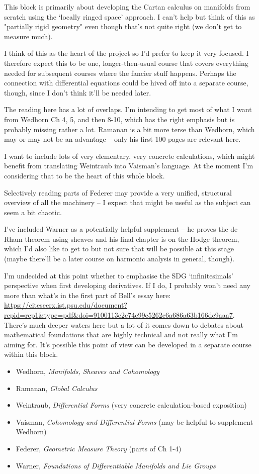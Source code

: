 \documentclass[article]{article}
\begin{document}
This block is primarily about developing the Cartan calculus on manifolds from scratch using the `locally ringed space' approach. I can't help but think of this as "partially rigid geometry" even though that's not quite right (we don't get to measure much). 

I think of this as the heart of the project so I'd prefer to keep it very focused. I therefore expect this to be one, longer-then-usual course that covers everything needed for subsequent courses where the fancier stuff happens. Perhaps the connection with differential equations could be hived off into a separate course, though, since I don't think it'll be needed later.

The reading here has a lot of overlaps. I'm intending to get most of what I want from Wedhorn Ch 4, 5, and then 8-10, which has the right emphasis but is probably missing rather a lot. Ramanan is a bit more terse than Wedhorn, which may or may not be an advantage -- only his first 100 pages are relevant here.

I want to include lots of very elementary, very concrete calculations, which might benefit from translating Weintraub into Vaisman's language. At the moment I'm considering that to be the heart of this whole block.

Selectively reading parts of Federer may provide a very unified, structural overview of all the machinery -- I expect that might be useful as the subject can seem a bit chaotic. 

I've included Warner as a potentially helpful supplement -- he proves the de Rham theorem using sheaves and his final chapter is on the Hodge theorem, which I'd also like to get to but not sure that will be possible at this stage (maybe there'll be a later course on harmonic analysis in general, though). 

I'm undecided at this point whether to emphasise the SDG `infinitesimals' perspective when first developing derivatives. If I do, I probably won't need any more than what's in the first part of Bell's essay here: \url{https://citeseerx.ist.psu.edu/document?repid=rep1&type=pdf&doi=9100113e2c74c99c5262c6a686a63b166dc9aaa7}. There's much deeper waters here but a lot of it comes down to debates about mathematical foundations that are highly technical and not really what I'm aiming for. It's possible this point of view can be developed in a separate course within this block.

\begin{itemize}
	\item[]{Wedhorn, \textit{Manifolds, Sheaves and Cohomology}}
	\item[]{Ramanan, \textit{Global Calculus}}
	\item[]{Weintraub, \textit{Differential Forms} (very concrete calculation-based exposition)}
	\item[]{Vaisman, \textit{Cohomology and Differential Forms} (may be helpful to supplement Wedhorn)}
	\item[]{Federer, \textit{Geometric Measure Theory} (parts of Ch 1-4)}
	\item[]{Warner, \textit{Foundations of Differentiable Manifolds and Lie Groups}}
\end{itemize}
\end{document}
